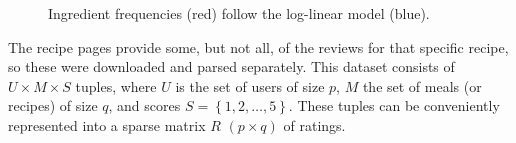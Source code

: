 \begin{figure}[htbp]
	\centering
	
	\caption{Ingredient frequencies (red) follow the log-linear model (blue).}
	\label{fig:ingredient_frequencies}
\end{figure}

The recipe pages provide some, but not all, of the reviews for that specific recipe, so these were downloaded and parsed separately.
This dataset consists of $U \times M \times S$ tuples, where $U$ is the set of users of size $p$, $M$ the set of meals (or recipes) of size $q$, and scores $S=\left\{1, 2, \dots, 5\right\}$.
These tuples can be conveniently represented into a sparse matrix $R$ $(p \times q)$ of ratings.

